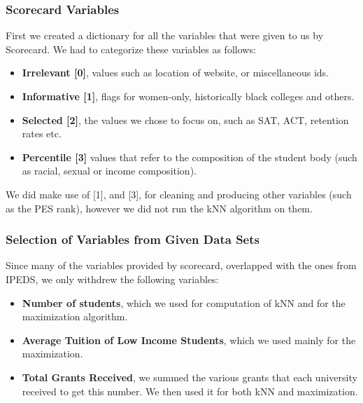 \documentclass[12pt]{scrartcl}
\begin{document}
		\subsubsection{Scorecard Variables}
			First we created a dictionary for all the variables that were given to us by Scorecard. We had to categorize these variables as follows:
			\begin{itemize}
				\item \textbf{Irrelevant [0]}, values such as location of website, or miscellaneous ids.
				\item \textbf{Informative [1]}, flags for women-only, historically black colleges and others. 
				\item \textbf{Selected [2]}, the values we chose to focus on, such as SAT, ACT, retention rates etc. 
				\item \textbf{Percentile [3]} values that refer to the composition of the student body (such as racial, sexual or income composition).
			\end{itemize}
			We did make use of [1], and [3], for cleaning and producing other variables (such as the PES rank), however we did not run the kNN algorithm on them.

		\subsubsection{Selection of Variables from Given Data Sets}
			Since many of the variables provided by scorecard, overlapped with the ones from IPEDS, we only withdrew the following variables:
			\begin{itemize}
				\item \textbf{Number of students}, which we used for computation of kNN and for the maximization algorithm.
				\item \textbf{Average Tuition of Low Income Students}, which we used mainly for the maximization.
				\item \textbf{Total Grants Received}, we summed the various grants that each university received to get this number. We then used it for both kNN and maximization.
			\end{itemize}
	
\end{document}
